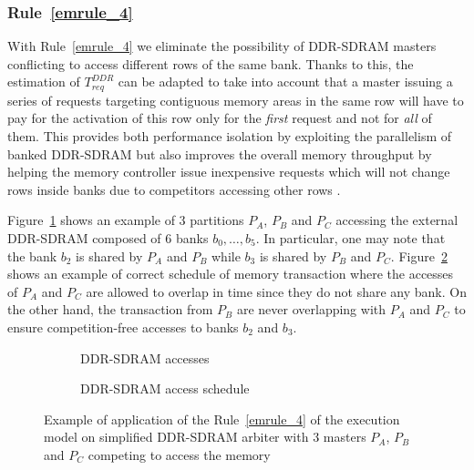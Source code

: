 \documentclass[main.tex]{subfiles}
\begin{document}
\subsubsection{Rule~\ref{emrule_4}}
With Rule~\ref{emrule_4} we eliminate the possibility of DDR-SDRAM masters
conflicting to access different rows of the same bank. Thanks to this, the
estimation of $T_{req}^{DDR}$ can be adapted to take into account that a master
issuing a series of requests targeting contiguous memory areas in the same row
will have to pay for the activation of this row only for the \emph{first}
request and not for \emph{all} of them. This provides both performance
isolation by exploiting the parallelism of banked DDR-SDRAM but also improves
the overall memory throughput by helping the memory controller issue
inexpensive requests which will not change rows inside banks due to competitors
accessing other rows .

\begin{example}
    Figure~\ref{fig_execModel_exampleRule4_ddr} shows an example of 3
    partitions $P_A$, $P_B$ and $P_C$ accessing the external DDR-SDRAM composed
    of 6 banks $b_0 , \ldots , b_5$. In particular, one may note that the bank
    $b_2$ is shared by $P_A$ and $P_B$ while $b_3$ is shared by $P_B$ and
    $P_C$. Figure~\ref{fig_execModel_exampleRule4_diagram} shows an example of
    correct schedule of memory transaction where the accesses of $P_A$ and
    $P_C$ are allowed to overlap in time since they do not share any bank. On
    the other hand, the transaction from $P_B$ are never overlapping with $P_A$
    and $P_C$ to ensure competition-free accesses to banks $b_2$ and $b_3$.
\end{example}

\begin{figure}
    \centering
    \begin{subfigure}[b]{0.3\linewidth}
    \centering
        \scalebox{0.6}{}
        \caption{DDR-SDRAM accesses}
        \label{fig_execModel_exampleRule4_ddr}
    \end{subfigure}\hspace{6mm}
    \begin{subfigure}[b]{0.65\linewidth}
    \centering
        
        \caption{DDR-SDRAM access schedule}
        \label{fig_execModel_exampleRule4_diagram}
    \end{subfigure}
    \caption{Example of application of the Rule~\ref{emrule_4} of the execution model on simplified DDR-SDRAM arbiter with 3 masters $P_A$, $P_B$ and $P_C$ competing to access the memory}
    \label{fig_execModel_exampleRule4}
\end{figure}
\end{document}
